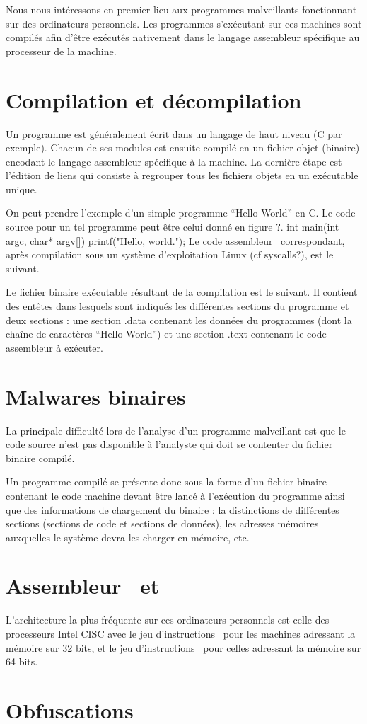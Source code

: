
Nous nous intéressons en premier lieu aux programmes malveillants fonctionnant sur des ordinateurs personnels.
Les programmes s'exécutant sur ces machines sont compilés afin d'être exécutés nativement dans le langage assembleur spécifique au processeur de la machine.

\section{Compilation et décompilation}
Un programme est généralement écrit dans un langage de haut niveau (C par exemple). Chacun de ses modules est ensuite compilé en un fichier objet (binaire) encodant le langage assembleur spécifique à la machine. La dernière étape est l'édition de liens qui consiste à regrouper tous les fichiers objets en un exécutable unique.

On peut prendre l'exemple d'un simple programme ``Hello World'' en C. Le code source pour un tel programme peut être celui donné en figure ?.
int main(int argc, char* argv[]){
  printf("Hello, world.");
}
Le code assembleur \xq\ correspondant, après compilation sous un système d'exploitation Linux (cf syscalls?), est le suivant.

Le fichier binaire exécutable résultant de la compilation est le suivant. Il contient des entêtes dans lesquels sont indiqués les différentes sections du programme et deux sections : une section .data contenant les données du programmes (dont la chaîne de caractères ``Hello World'') et une section .text contenant le code assembleur à exécuter.
\section{Malwares binaires}
La principale difficulté lors de l'analyse d'un programme malveillant est que le code source n'est pas disponible à l'analyste qui doit se contenter du fichier binaire compilé.

Un programme compilé se présente donc sous la forme d'un fichier binaire contenant le code machine devant être lancé à l'exécution du programme ainsi que des informations de chargement du binaire : la distinctions de différentes sections (sections de code et sections de données), les adresses mémoires auxquelles le système devra les charger en mémoire, etc.

\section{Assembleur \xq\ et \xs}
L'architecture la plus fréquente sur ces ordinateurs personnels est celle des processeurs Intel CISC avec le jeu d'instructions \xq\ pour les machines adressant la mémoire sur 32 bits, et le jeu d'instructions \xs\ pour celles adressant la mémoire sur 64 bits.

\section{Obfuscations}
